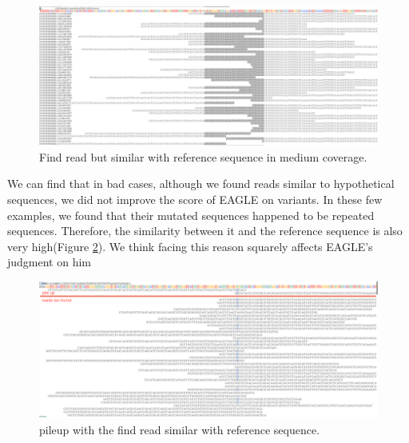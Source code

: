 \begin{figure}[H]
    \centering
    \includegraphics[width=1\columnwidth]{body/image/4-8.png}
    \captionsetup{labelfont=bf}
    \renewcommand{\baselinestretch}{1.0}
    \vspace{-1cm}
    \caption[Find reference reads in medium coverage]{Find read but similar with reference sequence in medium coverage.}
    \label{f4-8}
\end{figure}

We can find that in bad cases, although we found reads similar to hypothetical sequences, we did not improve the score of EAGLE on variants. In these few examples, we found that their mutated sequences happened to be repeated sequences. Therefore, the similarity between it and the reference sequence is also very high(Figure \ref{f4-9}). We think facing this reason squarely affects EAGLE's judgment on him

\vspace{1cm}
\begin{figure}[H]
    \centering
    \includegraphics[width=1\columnwidth]{body/image/4-9.png}
    \captionsetup{labelfont=bf}
    \renewcommand{\baselinestretch}{1.0}
    \vspace{-1cm}
    \caption[reference pileup in medium coverage]{pileup with the find read similar with reference sequence.}
    \label{f4-9}
\end{figure}

